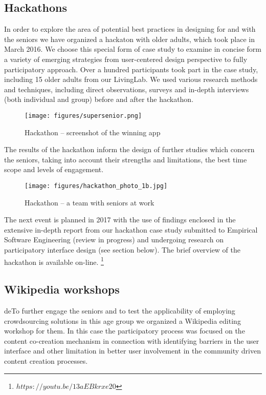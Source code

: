 \documentclass[sigconf]{acmart}
\begin{document}
\subsection{Hackathons}

In order to explore the area of potential best practices in designing for and with the seniors we have organized a hackaton with older adults, which took place in March 2016. We choose this special form of case study to examine in concise form a variety of emerging strategies from user-centered design perspective to fully participatory approach. Over a hundred participants took part in the case study, including 15 older adults from our LivingLab. We used various research methods and techniques, including direct observations, surveys and in-depth interviews (both individual and group) before and after the hackathon.

\begin{figure}
\centering
\texttt{[image: figures/supersenior.png]}
\caption{Hackathon -- screenshot of the winning app}
\label{fig:hackathon_photo}
\end{figure}

The results of the hackathon inform the design of further studies which concern the seniors, taking into account their strengths and limitations, the best time scope and levels of engagement. 

\begin{figure}
\centering
\texttt{[image: figures/hackathon\_photo\_1b.jpg]}
\caption{Hackathon -- a team with seniors at work}
\label{fig:hackathon_screen}
\end{figure}

The next event is planned in 2017 with the use of findings enclosed in the extensive in-depth report from our hackathon case study submitted to Empirical Software Engineering (review in progress) and undergoing research on participatory interface design (see section below). The brief overview of the hackathon is available on-line. \footnote{$https://youtu.be/13aEBkrxe20$}

\subsection{Wikipedia workshops}

deTo further engage the seniors and to test the applicability of employing crowdsourcing solutions in this age group we organized a Wikipedia editing workshop for them. In this case the participatory process was focused on the content co-creation mechanism in connection with identifying barriers in the user interface and other limitation in better user involvement in the community driven content creation processes. 
\end{document}
